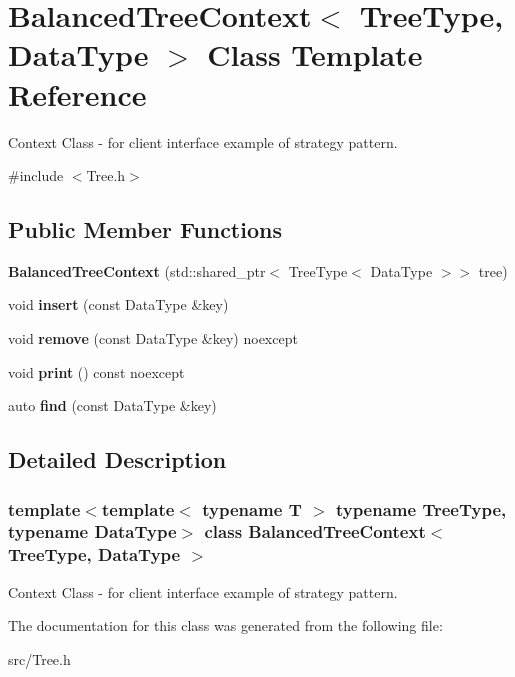 \hypertarget{classBalancedTreeContext}{}\section{Balanced\+Tree\+Context$<$ Tree\+Type, Data\+Type $>$ Class Template Reference}
\label{classBalancedTreeContext}


Context Class -\/ for client interface  example of strategy pattern.  




{\ttfamily \#include $<$Tree.\+h$>$}

\subsection*{Public Member Functions}
\begin{DoxyCompactItemize}
\item 
\mbox{\label{classBalancedTreeContext_a12a373eb9aecb45f69ad8966b5bb3b33}} 
{\bfseries Balanced\+Tree\+Context} (std\+::shared\+\_\+ptr$<$ Tree\+Type$<$ Data\+Type $>$$>$ tree)
\item 
\mbox{\label{classBalancedTreeContext_ade2008d8f07e21fe0ca1a945d76b1dfd}} 
void {\bfseries insert} (const Data\+Type \&key)
\item 
\mbox{\label{classBalancedTreeContext_a83ebaf1d3f3fd1f78f7aa3c9d6f01daf}} 
void {\bfseries remove} (const Data\+Type \&key) noexcept
\item 
\mbox{\label{classBalancedTreeContext_a1541969c675ff8c6672e250d8563715d}} 
void {\bfseries print} () const noexcept
\item 
\mbox{\label{classBalancedTreeContext_a6d619163f086eb4b62480ec7a991b900}} 
auto {\bfseries find} (const Data\+Type \&key)
\end{DoxyCompactItemize}


\subsection{Detailed Description}
\subsubsection*{template$<$template$<$ typename T $>$ typename Tree\+Type, typename Data\+Type$>$\newline
class Balanced\+Tree\+Context$<$ Tree\+Type, Data\+Type $>$}

Context Class -\/ for client interface  example of strategy pattern. 

The documentation for this class was generated from the following file\+:\begin{DoxyCompactItemize}
\item 
src/Tree.\+h\end{DoxyCompactItemize}
